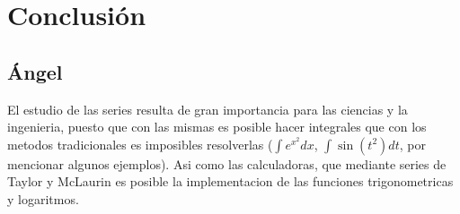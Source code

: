 \documentclass[12pt,letterpaper]{article}
\begin{document}

	\section{Conclusión}
		\subsection{Ángel}
			El estudio de las series resulta de gran importancia para las ciencias y la ingenieria, puesto 					que con las mismas es posible hacer integrales que con los metodos tradicionales es imposibles 
			resolverlas ($ \int e^{x^2} dx$, $ \int \sin (t^2)dt$, por mencionar algunos ejemplos). Asi como las 
			calculadoras, que mediante series de Taylor y McLaurin es posible la implementacion de las 
			funciones trigonometricas y logaritmos. 			
		
		
		
	
\end{document}
